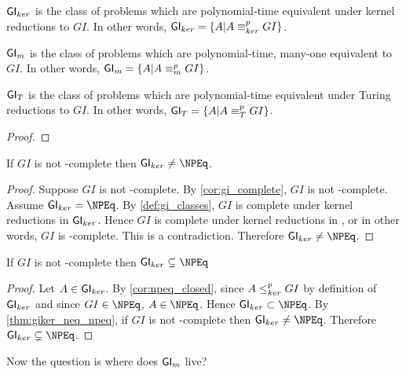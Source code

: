 \begin{definition}\label{def:gi_classes}${\mathsf{GI}}_{ker}$ is the class of problems
  which are polynomial-time equivalent under kernel reductions to $GI$. In
  other words, ${\mathsf{GI}}_{ker}=\{A|A\equiv^{p}_{ker} GI\}$.

  ${\mathsf{GI}}_m$ is the class of problems which are polynomial-time, many-one
  equivalent to $GI$. In other words, ${\mathsf{GI}}_m=\{A|A\equiv^{p}_m GI\}$.

  ${\mathsf{GI}}_T$ is the class of problems which are polynomial-time equivalent under
  Turing reductions to $GI$. In other words, ${\mathsf{GI}}_T=\{A|A\equiv^{p}_T GI\}$.
\end{definition}

\begin{lemma}\end{lemma}
\begin{proof}\end{proof}

\begin{theorem}\label{thm:giker_neq_npeq}If $GI$ is not \NP-complete then
  $\GIker\neq\NPEq$.\end{theorem}
\begin{proof}
  Suppose $GI$ is not \NP-complete. By \autoref{cor:gi_complete}, $GI$ is not
  \NPEq-complete. Assume $\GIker=\NPEq$. By \autoref{def:gi_classes}, $GI$ is
  complete under kernel reductions in ${\mathsf{GI}}_{ker}$. Hence $GI$ is complete under
  kernel reductions in \NPEq, or in other words, $GI$ is \NPEq-complete. This
  is a contradiction. Therefore $\GIker\neq\NPEq$.
\end{proof}

\begin{theorem}If $GI$ is not \NP-complete then
  $\GIker\subsetneq\NPEq$\end{theorem}
\begin{proof}Let $A\in{\ensuremath{\mathsf{GI}}}_{ker}$. By \autoref{cor:npeq_closed}, since $A\leq^{p}_{ker}
  GI$ by definition of ${\mathsf{GI}}_{ker}$ and since $GI\in\NPEq$, $A\in\NPEq$. Hence
  $\GIker\subset\NPEq$. By \autoref{thm:giker_neq_npeq}, if $GI$ is not
  \NP-complete then $\GIker\neq\NPEq$. Therefore
  $\GIker\subsetneq\NPEq$.\end{proof}

Now the question is where does ${\mathsf{GI}}_m$ live?